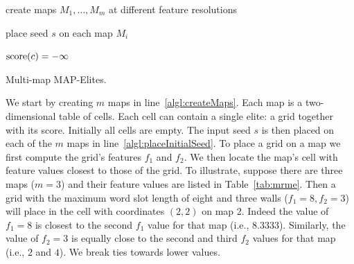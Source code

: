 \begin{algorithm}[t]
\DontPrintSemicolon 
{

create maps $M_1, \dots, M_m$ at different feature resolutions \; \label{algl:createMaps}

place seed $s$ on each map $M_i$ \; \label{algl:placeInitialSeed}

$\operatorname{score}(c) = -\infty$ \;

 \label{algl:mainLoopE}
}
\caption{\sc Multi-map MAP-Elites.}
\label{alg:mrme}
\end{algorithm}

We start by creating $m$ maps in line~\ref{algl:createMaps}. Each map is a two-dimensional table of cells. Each cell can contain a single elite: a grid together with its score. Initially all cells are empty. The input seed $s$ is then placed on each of the $m$ maps in line~\ref{algl:placeInitialSeed}. To place a grid on a map we first compute the grid's features $f_1$ and $f_2$. We then locate the map's cell with feature values closest to those of the grid. To illustrate, suppose there are three maps ($m=3$) and their feature values are listed in Table~\ref{tab:mrme}. Then a grid with the maximum word slot length of eight and three walls ($f_1 = 8, f_2 = 3$) will place in the cell with coordinates $(2,2)$ on map 2. Indeed the value of $f_1 = 8$ is closest to the second $f_1$ value for that map (i.e., $8.3333$). Similarly, the value of $f_2 = 3$ is equally close to the second and third $f_2$ values for that map (i.e., $2$ and $4$). We break ties towards lower values. 

